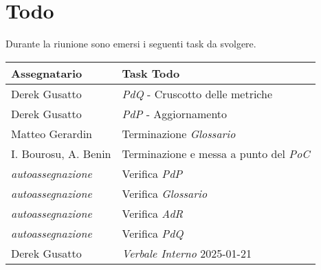\section{Todo}
Durante la riunione sono emersi i seguenti task da svolgere.

\begin{center}
  \begin{tabular}{|L{5cm}|L{8cm}|}
    \hline
    \textbf{Assegnatario} & \textbf{Task Todo} \\ \hline
    Derek Gusatto &  \textit{PdQ} - Cruscotto delle metriche \\ \hline
    Derek Gusatto &  \textit{PdP} - Aggiornamento\\ \hline
    Matteo Gerardin &  Terminazione \textit{Glossario} \\ \hline
    I. Bourosu, A. Benin &  Terminazione e messa a punto del \textit{PoC} \\ \hline
    \textit{autoassegnazione} &  Verifica \textit{PdP} \\ \hline
    \textit{autoassegnazione} &  Verifica \textit{Glossario} \\ \hline
    \textit{autoassegnazione} &  Verifica \textit{AdR} \\ \hline
    \textit{autoassegnazione} &  Verifica \textit{PdQ} \\ \hline
    Derek Gusatto &  \textit{Verbale Interno} 2025-01-21\\ \hline
  \end{tabular}
\end{center}